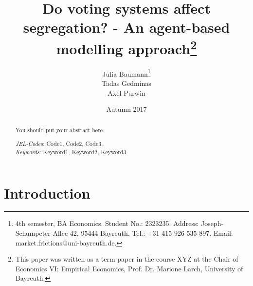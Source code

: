 \documentclass[12pt, a4paper]{article}
\title{{\Large Do voting systems affect segregation? - An agent-based modelling approach\footnote{This paper was written as a term paper in the course XYZ at the Chair of Economics VI: Empirical Economics, Prof. Dr. Marione Larch, University of Bayreuth.}}\\
\vspace{3mm}{\Large Term Paper, Software Engineering for Economists}%
}
\author{Julia Baumann\footnote{4th semester, BA Economics. Student No.: 2323235. Address: Joseph-Schumpeter-Allee 42, 95444 Bayreuth. Tel.: +31 415 926 535 897. Email: market.frictions@uni-bayreuth.de.}\\ Tadas Gedminas\\Axel Purwin}
\date{Autumn 2017}
\begin{document}
\maketitle \thispagestyle{empty}

\begin{abstract}

\setlength{\baselineskip}{10.5pt} 

\vspace{0.5cm} 
\noindent You should put your abstract here. 
\vspace{0.5cm} 

{\normalsize \noindent \emph{JEL-Codes}:  Code1, Code2, Code3.\\ %
\emph{Keywords}: Keyword1, Keyword2, Keyword3.} %
\end{abstract}

\newpage

\thispagestyle{empty}
\tableofcontents
\newpage

\newpage
\thispagestyle{empty}
\listoftables


\newpage
\thispagestyle{empty}
\listoffigures


\newpage


\setcounter{page}{1}%


\section{\label{sec_intro}Introduction}

\end{document}
